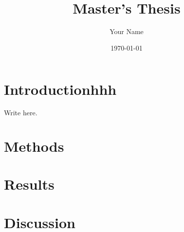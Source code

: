 \documentclass[12pt,a4paper]{report}
\title{Master's Thesis}
\author{Your Name}
\date{\today}
\begin{document}
\maketitle
\tableofcontents

\chapter{Introductionhhh}
Write here.

\chapter{Methods}

\chapter{Results}

\chapter{Discussion}

\end{document}
